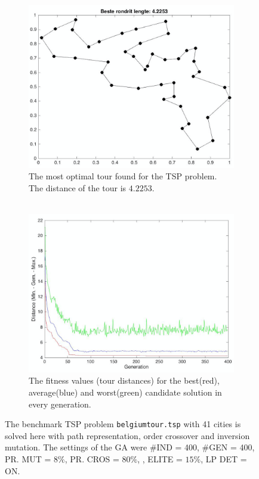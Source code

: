 \begin{figure}[!]
\centering
\begin{subfigure}{.5\textwidth}
  \centering
  \includegraphics[width=.88\linewidth]{../figures/figures_question_4/belgium_tour_path}
  \caption{The most optimal tour found for the TSP problem. The distance of the tour is $4.2253$.\\ \ \\}
  \label{fig:belgium_tour_4_path}
\end{subfigure}%
\begin{subfigure}{.5\textwidth}
  \centering
  \includegraphics[width=.9\linewidth]{../figures/figures_question_4/belgium_tour_gen}
  \caption{The fitness values (tour distances) for the best(red), average(blue) and worst(green) candidate solution in every generation. \\}
  \label{fig:belgium_tour_4_gen}
\end{subfigure}
\caption{The benchmark TSP problem \texttt{belgiumtour.tsp} with 41 cities is solved here with path representation, order crossover and inversion mutation. The settings of the GA were \#IND = 400, \#GEN = 400, PR. MUT = $8\%$, PR. CROS = $80\%$, , ELITE = $15\%$, LP DET = ON.}
\label{fig:belgium_tour_4}
\end{figure}

